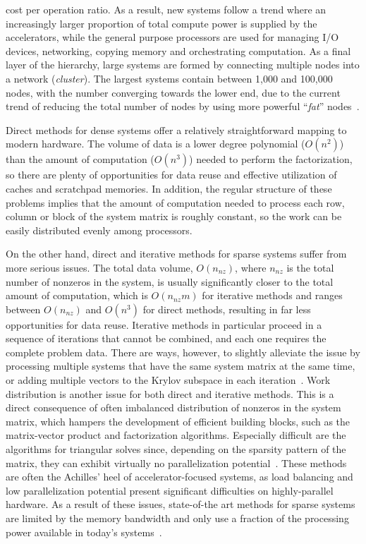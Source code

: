 cost per operation ratio. As a result, new systems follow a trend where an
increasingly larger proportion of total compute power is supplied by the
accelerators, while the general purpose processors are used for managing I/O
devices, networking, copying memory and orchestrating computation. As a final
layer of the hierarchy, large systems are formed by connecting multiple nodes
into a network (\ie \emph{cluster}). The largest systems contain between 1,000
and 100,000 nodes,
with the number converging towards the lower end, due to the current trend of
reducing the total number of nodes by using more powerful ``\emph{fat}''
nodes~\cite{top500}.

Direct methods for dense systems offer a relatively straightforward mapping to
modern hardware. The volume of data is a lower degree polynomial
($O(n^2)$) than the amount of computation ($O(n^3)$) needed to perform the
factorization, so there are plenty of opportunities for data reuse and effective
utilization of caches and scratchpad memories. In addition, the regular
structure of these problems implies that the amount of computation needed to
process each row, column or block of the system matrix is roughly constant, so
the work can be easily distributed evenly among processors.

On the other hand, direct and iterative methods for sparse systems suffer from
more serious issues. The total data volume, $O(n_{nz})$, where $n_{nz}$ is
the total number of nonzeros in the system, is usually significantly closer to
the total amount of computation, which is $O(n_{nz} m)$ for iterative
methods and ranges between $O(n_{nz})$ and $O(n^3)$ for direct methods,
resulting in far less opportunities for data reuse. Iterative methods in
particular proceed in a sequence of iterations that cannot be combined, and each
one requires the complete problem data. There are ways, however, to slightly
alleviate the issue by processing multiple systems that have the same system
matrix at the same time, or adding multiple vectors to the Krylov subspace in
each iteration~\cite{ca-gmres}. Work distribution is another issue for both
direct and iterative methods. This is a direct consequence of often imbalanced
distribution of nonzeros in the system matrix, which hampers the development of
efficient building blocks, such as the matrix-vector product and factorization
algorithms. Especially difficult are the algorithms for triangular solves since,
depending on the sparsity pattern of the matrix, they can exhibit virtually no
parallelization potential~\cite{triangular-solves}. These methods are often the
Achilles' heel of accelerator-focused systems, as load balancing and low
parallelization potential present significant difficulties on highly-parallel
hardware.  As a result of these issues, state-of-the art methods for sparse
systems are limited by the memory bandwidth and only use a fraction of the
processing power available in today's systems~\cite{top500}.
